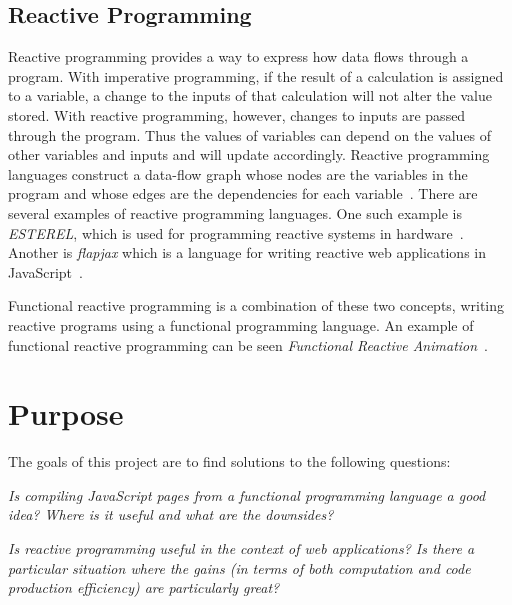 \subsection{Reactive Programming}
Reactive programming provides a way to express how data flows through a program. With imperative programming, if the result of a calculation is assigned to a variable, a change to the inputs of that calculation will not alter the value stored. With reactive programming, however, changes to inputs are passed through the program. Thus the values of variables can depend on the values of other variables and inputs and will update accordingly. Reactive programming languages construct a data-flow graph whose nodes are the variables in the program and whose edges are the dependencies for each variable~\cite{bib:functional_react,bib:lowering}. There are several examples of reactive programming languages. One such example is \emph{ESTEREL}, which is used for programming reactive systems in hardware~\cite{bib:esterel}. Another is \emph{flapjax} which is a language for writing reactive web applications in JavaScript~\cite{bib:flapjax}.

Functional reactive programming is a combination of these two concepts, writing reactive programs using a functional programming language. An example of functional reactive programming can be seen \emph{Functional Reactive Animation}~\cite{bib:fran}.

\section{Purpose}
\label{lab:goals}
The goals of this project are to find solutions to the following questions:

\emph{Is compiling JavaScript pages from a functional programming language a good idea? Where is it useful and what are the downsides?}

\emph{Is reactive programming useful in the context of web applications? Is there a particular situation where the gains (in terms of both computation and code production efficiency) are particularly great?}
